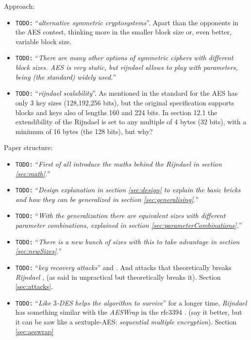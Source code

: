 \documentclass[10pt,a4paper,twoside]{llncs}
\newcommand{\todo}[1]{\texttt{\color{red}TODO:} ``\emph{#1}''}
\begin{document}
Approach:
\begin{itemize}
 \item \todo{alternative symmetric cryptosystems}. Apart than the opponents in the AES contest, thinking more in the smaller block size or, even better, variable block size. 
 \item \todo{There are many other options of symmetric ciphers with different block sizes. AES is very static, but rijndael allows to play with parameters, being (the standard) widely used.}
 \item \todo{rijndael scalability}. As mentioned in \cite{Daemen01aes-ammended} the standard for the AES has only 3 key sizes (128,192,256 bits), but the original specification supports blocks and keys also of lengths 160 and 224 bits. In section 12.1 the extendibility of the Rijndael is set to any multiple of 4 bytes (32 bits), with a minimum of 16 bytes (the 128 bits), but why?
\end{itemize}

Paper structure:
\begin{itemize}
 \item \todo{First of all introduce the maths behind the \emph{Rijndael} in section \ref{sec:math}.}
 \item \todo{Design explanation in section \ref{sec:design} to explain the basic bricks and how they can be generalized in section \ref{sec:generalising}.}
 \item \todo{With the generalization there are equivalent sizes with different parameter combinations, explained in section \ref{sec:parameterCombinations}.}
 \item \todo{There is a new bunch of sizes with this to take advantage in section \ref{sec:newSizes}.}
 \item \todo{key recovery attacks} \cite{fullaes-192-256} and \cite{cryptoeprint:2009:241}. And attacks that theoretically breaks \emph{Rijndael} \cite{cryptoeprint:2009:374}, \cite{biclique-fullaes} (as said in \cite{arXiv:1210.7942} unpractical but theoretically breaks it). Section \ref{sec:attacks}.
 \item \todo{Like \emph{$3$-DES} helps the algorithm to \emph{survive}} for a longer time, \emph{Rijndael} has something similar with the \emph{AESWrap} in the rfc3394 \cite{rfc3394}. (say it better, but it can be saw like a sextuple-AES: \emph{sequential multiple encryption}). Section \ref{sec:aeswrap}
\end{itemize}
\end{document}

